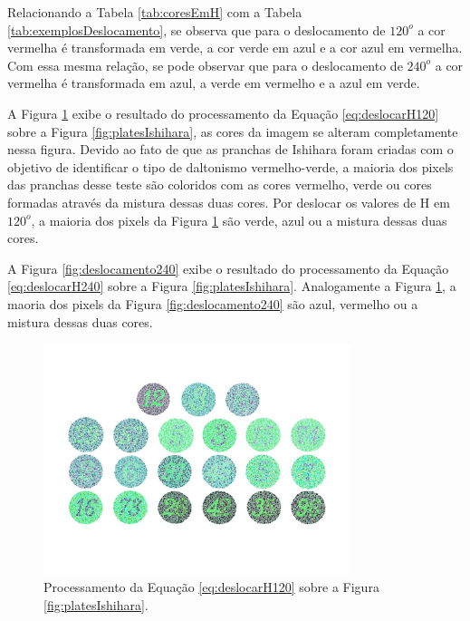 \documentclass[	12pt, Times, openright, twoside, a4paper, english, brazil]{abntex2}
\begin{document}
Relacionando a Tabela \ref{tab:coresEmH} com a Tabela \ref{tab:exemplosDeslocamento}, se observa que para o deslocamento de $120^o$ a cor vermelha é transformada em verde, a cor verde em azul e a cor azul em vermelha. Com essa mesma relação, se pode observar que para o deslocamento de $240^o$ a cor vermelha é transformada em azul, a verde em vermelho e a azul em verde.

A Figura \ref{fig:deslocamento120} exibe o resultado do processamento da Equação \ref{eq:deslocarH120} sobre a Figura \ref{fig:platesIshihara}, as cores da imagem se alteram completamente nessa figura. Devido ao fato de que as pranchas de Ishihara foram criadas com o objetivo de identificar o tipo de daltonismo vermelho-verde, a maioria dos pixels das pranchas desse teste são coloridos com as cores vermelho, verde ou cores formadas através da mistura dessas duas cores. Por deslocar os valores de H em $120^o$, a maioria dos pixels da Figura \ref{fig:deslocamento120} são verde, azul ou a mistura dessas duas cores.

A Figura \ref{fig:deslocamento240} exibe o resultado do processamento da Equação \ref{eq:deslocarH240} sobre a Figura \ref{fig:platesIshihara}. Analogamente a Figura \ref{fig:deslocamento120}, a maoria dos pixels da Figura \ref{fig:deslocamento240} são azul, vermelho ou a mistura dessas duas cores.

\begin{figure}[!htb]
\centering \includegraphics[width=0.80\textwidth]{figuraDeslocar120.jpg}
\caption{Processamento da Equação \ref{eq:deslocarH120} sobre a Figura \ref{fig:platesIshihara}. \label{fig:deslocamento120}}
\end{figure}
\end{document}
